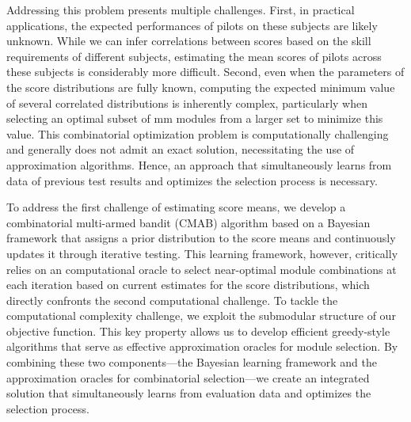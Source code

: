 \documentclass[opre,sglanonrev]{informs4}
\begin{document}
Addressing this problem presents multiple challenges. First, in practical applications, the expected performances of pilots on these subjects are likely unknown. While we can infer correlations between scores based on the skill requirements of different subjects, estimating the mean scores of pilots across these subjects is considerably more difficult. Second, even when the parameters of the score distributions are fully known, computing the expected minimum value of several correlated distributions is inherently complex, particularly when selecting an optimal subset of mm modules from a larger set to minimize this value. This combinatorial optimization problem is computationally challenging and generally does not admit an exact solution, necessitating the use of approximation algorithms. Hence, an approach that simultaneously learns from data of previous test results and optimizes the selection process is necessary.

To address the first challenge of estimating score means, we develop a combinatorial multi-armed bandit (CMAB) algorithm based on a Bayesian framework that assigns a prior distribution to the score means and continuously updates it through iterative testing. This learning framework, however, critically relies on an computational oracle to select near-optimal module combinations at each iteration based on current estimates for the score distributions, which directly confronts the second computational challenge. To tackle the computational complexity challenge, we exploit the submodular structure of our objective function. This key property allows us to develop efficient greedy-style algorithms that serve as effective approximation oracles for module selection. By combining these two components—the Bayesian learning framework and the approximation oracles for combinatorial selection—we create an integrated solution that simultaneously learns from evaluation data and optimizes the selection process. 
\end{document}
